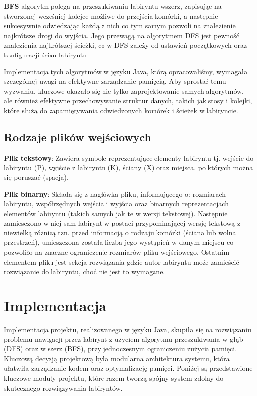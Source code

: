 \documentclass{article}
\begin{document}
\item \textbf{BFS} algorytm polega na przeszukiwaniu labiryntu wszerz, zapisując na stworzonej wcześniej kolejce możliwe do przejścia komórki, a następnie sukcesywnie odwiedzając każdą z nich co tym samym pozwoli na znalezienie najkrótsze drogi do wyjścia. Jego przewagą na algorytmem DFS jest pewność znalezienia najkrótszej ścieżki, co w DFS zależy od ustawień początkowych oraz konfiguracji ścian labiryntu.

\vspace{5mm}

Implementacja tych algorytmów w języku Java, którą opracowaliśmy, wymagała szczególnej uwagi na efektywne zarządzanie pamięcią. Aby sprostać temu wyzwaniu, kluczowe okazało się nie tylko zaprojektowanie samych algorytmów, ale również efektywne przechowywanie struktur danych, takich jak stosy i kolejki, które służą do zapamiętywania odwiedzonych komórek i ścieżek w labiryncie.

\subsection{Rodzaje plików wejściowych}

\item \textbf{Plik tekstowy}: Zawiera symbole reprezentujące elementy labiryntu tj. wejście do labiryntu (P), wyjście z labiryntu (K), ściany (X) oraz miejsca, po których można się poruszać (spacja).

\item \textbf{Plik binarny}: Składa się z nagłówka pliku, informującego o: rozmiarach labiryntu, współrzędnych wejścia i wyjścia oraz binarnych reprezentacjach elementów labiryntu (takich samych jak te w wersji tekstowej). Następnie zamiesczono w niej sam labirynt w postaci przypominającej wersję tekstową z niewielką różnicą tzn. przed informacją o rodzaju komórki (ściana lub wolna przestrzeń), umieszczona została liczba jego wystąpień w danym miejscu co pozwoliło na znaczne ograniczenie rozmiarów pliku wejściowego. Ostatnim elementem pliku jest sekcja rozwiązania gdzie autor labiryntu może zamieścić rozwiązanie do labiryntu, choć nie jest to wymagane.

\section{Implementacja}

Implementacja projektu, realizowanego w języku Java, skupiła się na rozwiązaniu problemu nawigacji przez labirynt z użyciem algorytmu przeszukiwania w głąb (DFS) oraz w szerz (BFS), przy jednoczesnym ograniczeniu zużycia pamięci. Kluczową decyzją projektową była modularna architektura systemu, która ułatwiła zarządzanie kodem oraz optymalizację pamięci. Poniżej są przedstawione kluczowe moduły projektu, które razem tworzą spójny system zdolny do skutecznego rozwiązywania labiryntów.
\end{document}
